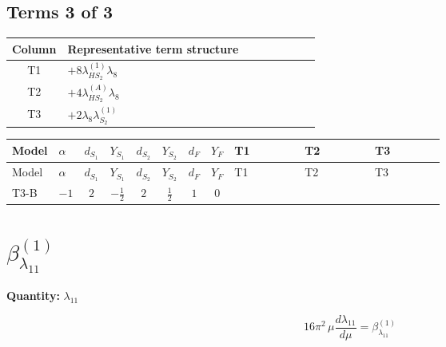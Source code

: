 \documentclass[8pt]{article}
\begin{document}
\begin{landscape}
\subsection*{Terms 3 of 3}
\begin{center}
\begin{tabular}{@{}c >{\raggedright\arraybackslash}p{0.82\linewidth}@{}}
\toprule
Column & Representative term structure \\
\midrule
T1 & \(\displaystyle +8 {\lambda_{HS_2}^{(1)}} {\lambda_{8}}\) \\
\midrule
T2 & \(\displaystyle +4 {\lambda_{HS_2}^{(A)}} {\lambda_{8}}\) \\
\midrule
T3 & \(\displaystyle +2 {\lambda_{8}} {\lambda_{S_2}^{(1)}}\) \\
\midrule
\bottomrule
\end{tabular}
\end{center}
\smallskip
\tiny
\begin{longtable}{@{}llcccccc >{\raggedright\arraybackslash}p{0.21\linewidth} >{\raggedright\arraybackslash}p{0.21\linewidth} >{\raggedright\arraybackslash}p{0.21\linewidth}@{}}
\toprule
Model & $\alpha$ & $d_{S_1}$ & $Y_{S_1}$ & $d_{S_2}$ & $Y_{S_2}$ & $d_F$ & $Y_F$ & T1 & T2 & T3 \\
\midrule
\endfirsthead
\toprule
Model & $\alpha$ & $d_{S_1}$ & $Y_{S_1}$ & $d_{S_2}$ & $Y_{S_2}$ & $d_F$ & $Y_F$ & T1 & T2 & T3 \\
\midrule
\endhead
T3-B & $-1$ & $2$ & $-\frac{1}{2}$ & $2$ & $\frac{1}{2}$ & $1$ & $0$ & \scriptsize\adjustbox{max width=\linewidth}{$\begin{gathered} +8 {\lambda_{HS_2}^{(1)}} {\lambda_{8}}\end{gathered}$} & \scriptsize\adjustbox{max width=\linewidth}{$\begin{gathered} +4 {\lambda_{HS_2}^{(A)}} {\lambda_{8}}\end{gathered}$} & \scriptsize\adjustbox{max width=\linewidth}{$\begin{gathered} +2 {\lambda_{8}} {\lambda_{S_2}^{(1)}}\end{gathered}$} \\
\midrule
\bottomrule
\end{longtable}
\clearpage
\section*{$\beta_{\lambda_{11}}^{(1)}$}
\noindent\textbf{Quantity: }$\lambda_{11}$\par\smallskip
\[16\pi^2\,\mu\frac{d \lambda_{11}}{d\mu}=\beta_{\lambda_{11}}^{(1)}\]

\end{landscape}
\end{document}
